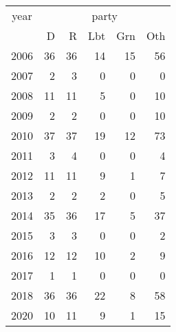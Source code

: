 \footnotesize\begin{tabular}[t]{lrrrrr}
\toprule
\multicolumn{1}{c}{year} & \multicolumn{5}{c}{party} \\
\cmidrule(l{3pt}r{3pt}){1-1} \cmidrule(l{3pt}r{3pt}){2-6}
  & D & R & Lbt & Grn & Oth\\
\midrule
2006 & 36 & 36 & 14 & 15 & 56\\
2007 & 2 & 3 & 0 & 0 & 0\\
2008 & 11 & 11 & 5 & 0 & 10\\
2009 & 2 & 2 & 0 & 0 & 10\\
2010 & 37 & 37 & 19 & 12 & 73\\
2011 & 3 & 4 & 0 & 0 & 4\\
2012 & 11 & 11 & 9 & 1 & 7\\
2013 & 2 & 2 & 2 & 0 & 5\\
2014 & 35 & 36 & 17 & 5 & 37\\
2015 & 3 & 3 & 0 & 0 & 2\\
2016 & 12 & 12 & 10 & 2 & 9\\
2017 & 1 & 1 & 0 & 0 & 0\\
2018 & 36 & 36 & 22 & 8 & 58\\
2020 & 10 & 11 & 9 & 1 & 15\\
\bottomrule
\end{tabular}
